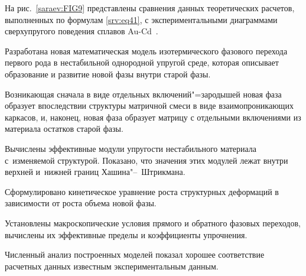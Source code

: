 На рис.~\ref{saraev:FIG9} представлены сравнения данных теоретических расчетов, выполненных по формулам \eqref{srv:eq41}, с экспериментальными диаграммами сверхупругого поведения сплавов Au-Cd~\cite{Nakanishi1973}.


\newpage

Разработана новая математическая модель изотермического фазового перехода первого рода в нестабильной однородной упругой среде, которая описывает образование и развитие новой фазы внутри старой фазы.

Возникающая сначала в виде отдельных включений"=зародышей новая фаза образует впоследствии структуры матричной смеси в виде взаимопроникающих каркасов, и, наконец, новая фаза образует матрицу с отдельными включениями из материала остатков старой фазы.

Вычислены эффективные модули упругости нестабильного материала с~изменяемой структурой. Показано, что значения этих модулей лежат внутри верхней и~нижней границ Хашина"--~Штрикмана.

Сформулировано кинетическое уравнение роста структурных деформаций в зависимости от роста объема новой фазы.

Установлены макроскопические условия прямого и обратного фазовых переходов, вычислены их эффективные пределы и коэффициенты упрочнения.

Численный анализ построенных моделей показал хорошее соответствие расчетных данных известным экспериментальным данным.

\smallskip






